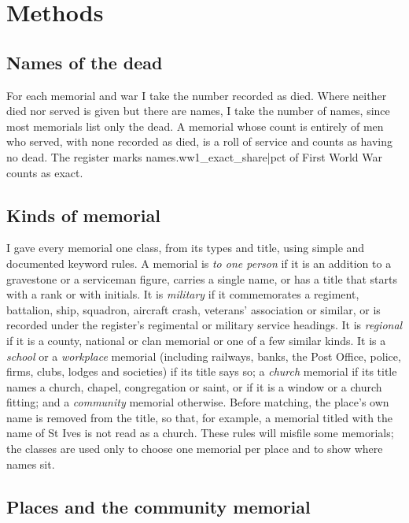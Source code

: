 \documentclass[11pt,a4paper]{article}
\begin{document}
\section{Methods}

\subsection{Names of the dead}

For each memorial and war I take the number recorded as died. Where neither died nor served is given but there are names, I take the number of names, since most memorials list only the dead. A memorial whose count is entirely of men who served, with none recorded as died, is a roll of service and counts as having no dead. The register marks {{names.ww1_exact_share|pct}} of First World War counts as exact.

\subsection{Kinds of memorial}

I gave every memorial one class, from its types and title, using simple and documented keyword rules. A memorial is \emph{to one person} if it is an addition to a gravestone or a serviceman figure, carries a single name, or has a title that starts with a rank or with initials. It is \emph{military} if it commemorates a regiment, battalion, ship, squadron, aircraft crash, veterans' association or similar, or is recorded under the register's regimental or military service headings. It is \emph{regional} if it is a county, national or clan memorial or one of a few similar kinds. It is a \emph{school} or a \emph{workplace} memorial (including railways, banks, the Post Office, police, firms, clubs, lodges and societies) if its title says so; a \emph{church} memorial if its title names a church, chapel, congregation or saint, or if it is a window or a church fitting; and a \emph{community} memorial otherwise. Before matching, the place's own name is removed from the title, so that, for example, a memorial titled with the name of St Ives is not read as a church. These rules will misfile some memorials; the classes are used only to choose one memorial per place and to show where names sit.

\subsection{Places and the community memorial}
\end{document}
